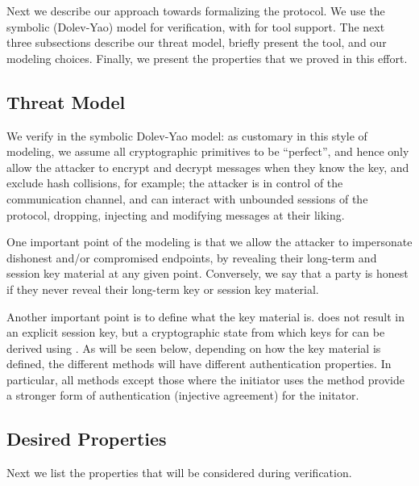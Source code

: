 \fillhack
Next we describe our approach towards formalizing the \mEdhoc{} protocol. We use the
symbolic (Dolev-Yao) model for verification, with \mTamarin{} for tool support.
%
The next three subsections describe our threat model, briefly present the
\mTamarin{} tool, and our modeling choices.
%
Finally, we present the properties that we proved in this effort.

\spacehack
\subsection{Threat Model}\label{sec:threat-model}
\fillhack
We verify \mEdhoc{} in the symbolic Dolev-Yao model: as customary in this style of
modeling, we assume all cryptographic primitives to be ``perfect'', and hence
only allow the attacker to encrypt and decrypt messages when they know the key,
and exclude hash collisions, for example; the attacker is in control of the
communication channel, and can interact with unbounded sessions of the protocol,
dropping, injecting and modifying messages at their liking.

One important point of the modeling is that we allow the attacker to impersonate
dishonest and/or compromised endpoints, by revealing their long-term and session
key material at any given point.
%
Conversely, we say that a party is honest if they never reveal their
long-term key or session key material.

Another important point is to define what the key material is.
    \mEdhoc{} does not result in an explicit session key, but a cryptographic
    state from which keys for \mOscore{} can be derived using \mHkdf.
    As will be seen below, depending on how the key material is defined, the
    different methods will have different authentication properties.
    In particular, all methods except those where the initiator uses the
    \mStat{} method provide a stronger form of authentication (injective
    agreement) for the initator.

\spacehack
\subsection{Desired Properties}
\label{sec:desired-properties}
\fillhack
Next we list the properties that will be considered during verification.

